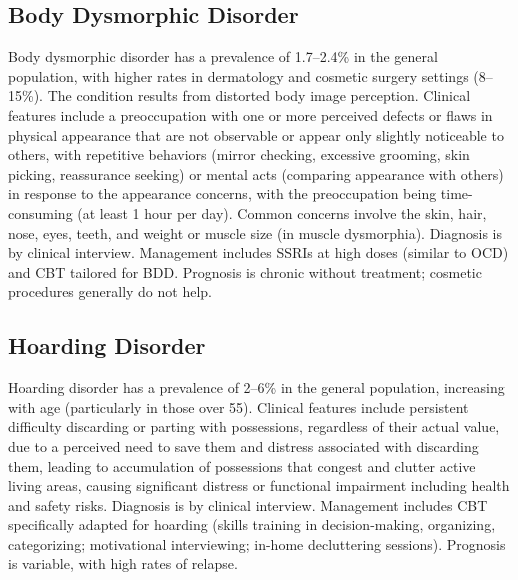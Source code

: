 


\label{sec:Obsessive-Compulsive and Related Disorders}

\subsection{Body Dysmorphic Disorder}
\label{sec:Body Dysmorphic Disorder}
Body dysmorphic disorder has a prevalence of 1.7--2.4\% in the general population, with higher rates in dermatology and cosmetic surgery settings (8--15\%). The condition results from distorted body image perception. Clinical features include a preoccupation with one or more perceived defects or flaws in physical appearance that are not observable or appear only slightly noticeable to others, with repetitive behaviors (mirror checking, excessive grooming, skin picking, reassurance seeking) or mental acts (comparing appearance with others) in response to the appearance concerns, with the preoccupation being time-consuming (at least 1 hour per day). Common concerns involve the skin, hair, nose, eyes, teeth, and weight or muscle size (in muscle dysmorphia). Diagnosis is by clinical interview. Management includes SSRIs at high doses (similar to OCD) and CBT tailored for BDD. Prognosis is chronic without treatment; cosmetic procedures generally do not help.

\subsection{Hoarding Disorder}
\label{sec:Hoarding Disorder}
Hoarding disorder has a prevalence of 2--6\% in the general population, increasing with age (particularly in those over 55). Clinical features include persistent difficulty discarding or parting with possessions, regardless of their actual value, due to a perceived need to save them and distress associated with discarding them, leading to accumulation of possessions that congest and clutter active living areas, causing significant distress or functional impairment including health and safety risks. Diagnosis is by clinical interview. Management includes CBT specifically adapted for hoarding (skills training in decision-making, organizing, categorizing; motivational interviewing; in-home decluttering sessions). Prognosis is variable, with high rates of relapse.

